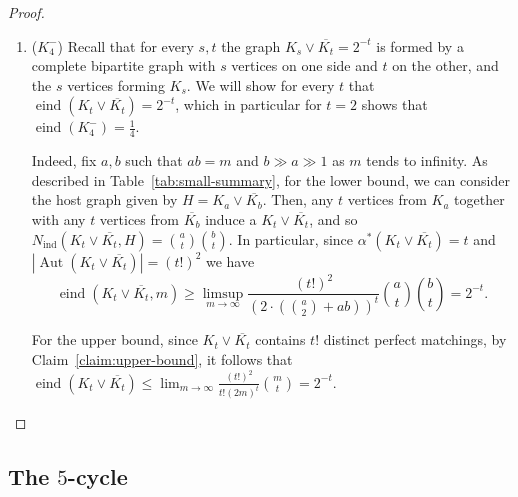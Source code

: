 \documentclass[reqno,11pt]{amsart}
\numberwithin{equation}{section}
\theoremstyle{definition}
\theoremstyle{remark}
\newcommand{\abs}[1]{\left\lvert#1\right\rvert}
\DeclareMathOperator{\ind}{ind}
\DeclareMathOperator{\eind}{eind}
\DeclareMathOperator{\Aut}{Aut}
\begin{document}
\begin{proof}
\begin{enumerate}[leftmargin=*,topsep=0pt]
\begin{figure}[!htp]
{}
        \caption{Local digraph for $K_3^+$.}
        \label{fig:tri-pendant}
    \end{figure}
    \item [(7)] ($K_4^-$) Recall that for every $s,t$ the graph $K_s \lor \overline{K_t}=2^{-t}$ is formed by a complete bipartite graph with $s$ vertices on one side and $t$ on the other, and the $s$ vertices forming $K_s$. We will show for every $t$ that $\eind(K_t \lor \overline{K_t}) = 2^{-t}$, which in particular for $t=2$ shows that $\eind(K_4^-) =\frac{1}{4}$.
        
    Indeed, fix $a,b$ such that $ab =m$ and $b \gg a \gg 1$ as $m$ tends to infinity. 
    As described in Table~\ref{tab:small-summary}, for the lower bound, we can consider the host graph given by $H=K_a \lor \overline{K_b}$. Then, any $t$ vertices from $K_a$ together with any $t$ vertices from $\overline{K_b}$ induce a $K_t \lor \overline{K_t}$, and so $N_{\ind}(K_t \lor \overline{K_t}, H) = \binom{a}{t}\binom{b}{t}$. In particular, since $\alpha^*(K_t \lor \overline{K_t}) = t$ and $\abs{\Aut(K_t \lor \overline{K_t})}=(t!)^2$ we have \[\eind(K_t \lor \overline{K_t}, m) \geq \limsup_{m\to \infty} \frac{(t!)^2}{\left(2 \cdot \left( \binom{a}{2} + ab \right) \right)^t}\binom{a}{t}\binom{b}{t} = 2^{-t}.\] 

    For the upper bound, since $K_t \lor \overline{K_t}$ contains $t!$ distinct perfect matchings, by Claim~\ref{claim:upper-bound}, it follows that $\eind(K_t \lor \overline{K_t}) \leq \lim_{m \to \infty} \frac{(t!)^2}{t!(2m)^t} \binom{m}{t} = 2^{-t}$.\qedhere
\end{enumerate}
\end{proof}


\subsection{The $5$-cycle}\label{sec: five cycle}
\end{document}
